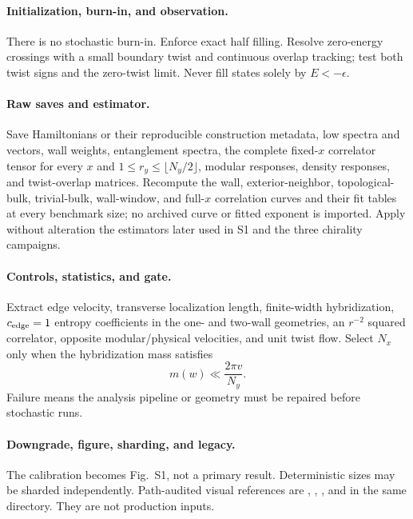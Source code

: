 \documentclass[aps,prx,onecolumn,nofootinbib,superscriptaddress,longbibliography]{revtex4-2}
\begin{document}
\paragraph{Initialization, burn-in, and observation.}
There is no stochastic burn-in.  Enforce exact half filling.  Resolve zero-energy crossings
with a small boundary twist and continuous overlap tracking; test both twist signs and the
zero-twist limit.  Never fill states solely by $E<-\epsilon$.

\paragraph{Raw saves and estimator.}
Save Hamiltonians or their reproducible construction metadata, low spectra and vectors,
wall weights, entanglement spectra, the complete fixed-$x$ correlator tensor for every
$x$ and $1\leq r_y\leq\lfloor N_y/2\rfloor$, modular responses, density responses, and
twist-overlap matrices.  Recompute the wall, exterior-neighbor, topological-bulk,
trivial-bulk, wall-window, and full-$x$ correlation curves and their fit tables at every
benchmark size; no archived curve or fitted exponent is imported.  Apply without
alteration the estimators later used in S1 and the three chirality campaigns.

\paragraph{Controls, statistics, and gate.}
Extract edge velocity, transverse localization length, finite-width hybridization,
$c_{\rm edge}=1$ entropy coefficients in the one- and two-wall geometries, an $r^{-2}$ squared
correlator, opposite modular/physical velocities, and unit twist flow.  Select $N_x$ only
when the hybridization mass satisfies
\begin{equation}
 m(w)\ll \frac{2\pi v}{N_y}.
\end{equation}
Failure means the analysis pipeline or geometry must be repaired before stochastic runs.

\paragraph{Downgrade, figure, sharding, and legacy.}
The calibration becomes Fig.~S1, not a primary result.  Deterministic sizes may be sharded
independently.  Path-audited visual references are
,
,
, and  in the same
directory.  They are not production inputs.
\end{document}

